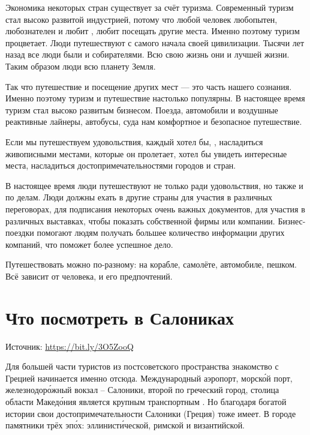 Экономика некоторых стран существует за счёт туризма. Современный туризм стал высоко развитой индустрией, потому что любой человек любопытен, любознателен и любит , любит посещать другие места. Именно поэтому туризм процветает.
Люди путешествуют с самого начала своей цивилизации. Тысячи лет назад все люди были  и собирателями. Всю свою жизнь они    и лучшей жизни. Таким образом люди  всю планету Земля.

Так что путешествие и посещение других мест --- это часть нашего сознания. Именно поэтому туризм и путешествие настолько популярны. В настоящее время туризм стал высоко развитым бизнесом. Поезда, автомобили и воздушные реактивные лайнеры, автобусы, суда  нам комфортное и безопасное путешествие.

Если мы путешествуем  удовольствия, каждый хотел бы, , насладиться живописными местами, которые он пролетает, хотел бы увидеть интересные места, насладиться достопримечательностями городов и стран.

В настоящее время люди путешествуют не только ради удовольствия, но также и по делам. Люди должны ехать в другие страны для участия в различных переговорах, для подписания некоторых очень важных документов, для участия в различных выставках, чтобы показать  собственной фирмы или компании. Бизнес-поездки помогают людям получать большее количество информации   других компаний, что поможет  более успешное дело.

Путешествовать можно по-разному: на корабле, самолёте, автомобиле, пешком. Всё зависит от человека, и его предпочтений.


\newpage
\section{Что посмотреть в Салониках}
Источник: \url{https://bit.ly/3O5ZooQ}

Для большей части туристов из постсоветского пространства знакомство с Грецией начинается именно отсюда. Международный аэропорт, морск\'{о}й порт, железнодор\'{о}жный вокзал -- Салоники, второй по  греческий город, столица области Макед\'{о}ния является крупным транспортным . Но благодаря богатой истории свои достопримечательности Салоники (Греция) тоже имеет. В городе  памятники трёх эп\'{о}х: эллинист\'{и}ческой, римской и византийской.


